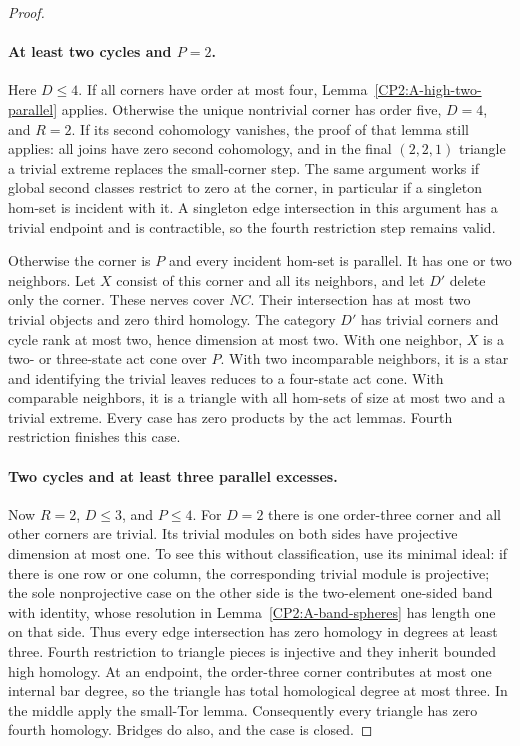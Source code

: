 \begin{proof}
\paragraph{At least two cycles and $P=2$.}
Here $D\leq4$.  If all corners have order at most four,
Lemma~\ref{CP2:A-high-two-parallel} applies.  Otherwise
the unique nontrivial corner has order five, $D=4$,
and $R=2$.  If its second cohomology vanishes, the proof
of that lemma still applies: all joins have zero second
cohomology, and in the final $(2,2,1)$ triangle a trivial
extreme replaces the small-corner step.  The same argument
works if global second classes restrict to zero at the
corner, in particular if a singleton hom-set is incident
with it.  A singleton edge intersection in this argument
has a trivial endpoint and is contractible, so the fourth
restriction step remains valid.

Otherwise the corner is $P$ and every incident hom-set
is parallel.  It has one or two neighbors.  Let $X$
consist of this corner and all its neighbors, and let
$D'$ delete only the corner.  These nerves cover $NC$.
Their intersection has at most two trivial objects and
zero third homology.  The category $D'$ has trivial
corners and cycle rank at most two, hence dimension at
most two.  With one neighbor, $X$ is a two- or three-state
act cone over $P$.  With two incomparable neighbors,
it is a star and identifying the trivial leaves reduces
to a four-state act cone.  With comparable neighbors,
it is a triangle with all hom-sets of size at most two
and a trivial extreme.  Every case has zero products by
the act lemmas.  Fourth restriction finishes this case.

\paragraph{Two cycles and at least three parallel excesses.}
Now $R=2$, $D\leq3$, and $P\leq4$.  For $D=2$ there
is one order-three corner and all other corners are
trivial.  Its trivial modules on both sides have projective
dimension at most one.  To see this without classification,
use its minimal ideal: if there is one row or one column,
the corresponding trivial module is projective; the sole
nonprojective case on the other side is the two-element
one-sided band with identity, whose resolution in
Lemma~\ref{CP2:A-band-spheres} has length one on that side.
Thus every edge intersection has zero homology in degrees
at least three.  Fourth restriction to triangle pieces is
injective and they inherit bounded high homology.  At an
endpoint, the order-three corner contributes at most one
internal bar degree, so the triangle has total homological
degree at most three.  In the middle apply the small-Tor
lemma.  Consequently every triangle has zero fourth
homology.  Bridges do also, and the case is closed.


\end{proof}

